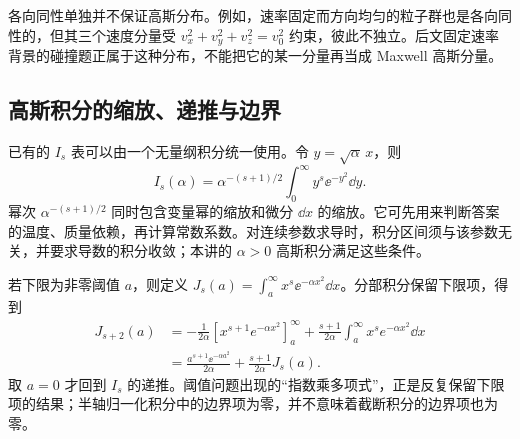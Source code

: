 各向同性单独并不保证高斯分布。例如，速率固定而方向均匀的粒子群也是各向同性的，但其三个速度分量受 $v_x^2+v_y^2+v_z^2=v_0^2$ 约束，彼此不独立。后文固定速率背景的碰撞题正属于这种分布，不能把它的某一分量再当成 Maxwell 高斯分量。

\subsection{高斯积分的缩放、递推与边界}
已有的 $I_s$ 表可以由一个无量纲积分统一使用。令 $y=\sqrt\alpha\,x$，则
\[
 I_s(\alpha)=\alpha^{-(s+1)/2}
 \int_0^\infty y^s\ee^{-y^2}\dd y.
\]
幂次 $\alpha^{-(s+1)/2}$ 同时包含变量幂的缩放和微分 $\dd x$ 的缩放。它可先用来判断答案的温度、质量依赖，再计算常数系数。对连续参数求导时，积分区间须与该参数无关，并要求导数的积分收敛；本讲的 $\alpha>0$ 高斯积分满足这些条件。

若下限为非零阈值 $a$，则定义
$J_s(a)=\int_a^\infty x^s\ee^{-\alpha x^2}\dd x$。分部积分保留下限项，得到
\[
\begin{aligned}
 J_{s+2}(a)&=-\frac1{2\alpha}[x^{s+1}e^{-\alpha x^2}]_a^\infty
+\frac{s+1}{2\alpha}\int_a^\infty x^se^{-\alpha x^2}\dd x\\
&=\frac{a^{s+1}\ee^{-\alpha a^2}}{2\alpha}
 +\frac{s+1}{2\alpha}J_s(a).
\end{aligned}
\]
取 $a=0$ 才回到 $I_s$ 的递推。阈值问题出现的“指数乘多项式”，正是反复保留下限项的结果；半轴归一化积分中的边界项为零，并不意味着截断积分的边界项也为零。


